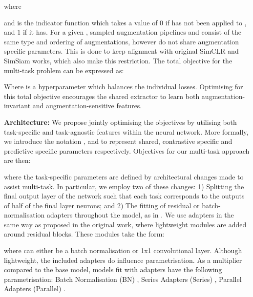 \documentclass{INTERSPEECH2023}
\begin{document}
where 

and  is the indicator function which takes a value of 0 if  has not been applied to , and 1 if it has. For a given , sampled augmentation pipelines  and  consist of the same type and ordering of augmentations, however do not share augmentation specific parameters. This is done to keep alignment with original SimCLR \cite{simclr} and SimSiam \cite{simsiam} works, which also make this restriction. The total objective for the multi-task problem can be expressed as:

Where  is a hyperparameter which balances the individual losses. Optimising for this total objective encourages the shared extractor  to learn both augmentation-invariant and augmentation-sensitive features.

\noindent\textbf{Architecture:} We propose jointly optimising the objectives by utilising both task-specific and task-agnostic features within the neural network. More formally, we introduce the notation ,  and  to represent shared, contrastive specific and predictive specific parameters respectively. Objectives for our multi-task approach are then:


where the task-specific parameters are defined by architectural changes made to assist multi-task. In particular, we employ two of these changes: 1) Splitting the final output layer of the network such that each task corresponds to the outputs of half of the final layer neurons; and 2) The fitting of residual or batch-normalisation adapters throughout the model, as in \cite{residual_adapters}. We use adapters in the same way as proposed in the original work, where lightweight modules are added around residual blocks. These modules take the form:

where  can either be a batch normalisation or 1x1 convolutional layer. Although lightweight, the included adapters do influence parametrisation. As a multiplier compared to the base model, models fit with adapters have the following parametrisation: Batch Normalisation (BN) , Series Adapters (Series) , Parallel Adapters (Parallel) .
\end{document}
